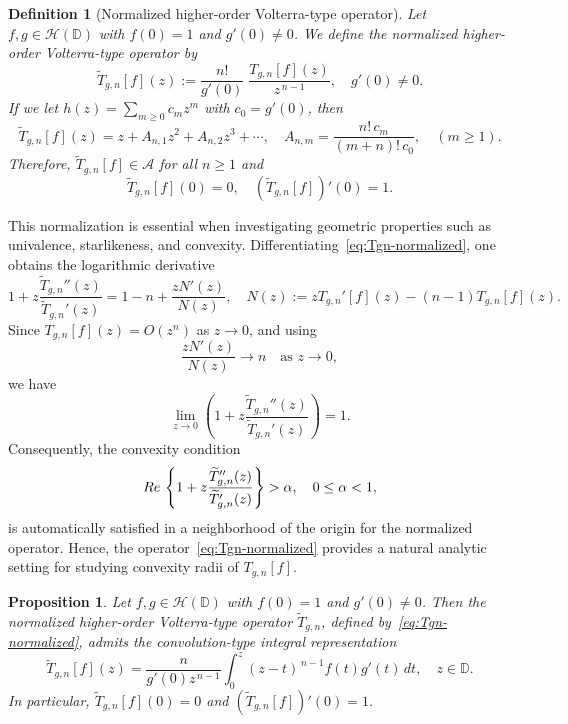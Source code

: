 \documentclass[12pt,a4paper]{amsart}
\numberwithin{equation}{section}
\newtheorem{definition}{Definition}[section]
\newtheorem{proposition}{Proposition}[section]
\theoremstyle{remark}
\begin{document}
\begin{definition}[Normalized higher-order Volterra-type operator]\label{def:normalized-higher}
\rm
Let \(f,g\in\mathcal{H}(\mathbb{D})\) with \(f(0)=1\) and \(g'(0)\neq0\).
We define the normalized higher-order Volterra-type operator by
\begin{equation}\label{eq:Tgn-normalized}
\widetilde T_{g,n}[f](z)
:=\frac{n!}{g'(0)}\;\frac{T_{g,n}[f](z)}{z^{\,n-1}},\quad g'(0)\neq0.
\end{equation}
If we let $h(z)=\sum_{m\ge0}c_m z^m$ with $c_0=g'(0)$, then
\[
\widetilde T_{g,n}[f](z)
= z + A_{n,1} z^2 + A_{n,2} z^3 + \cdots,
\quad
A_{n,m}=\frac{n!\,c_m}{(m+n)!\,c_0},\quad(m\ge1).
\]
Therefore,  \(\widetilde T_{g,n}[f]\in\mathcal{A}\) for all \(n\ge1\) and
\[
\widetilde T_{g,n}[f](0) =0,
\quad 
(\widetilde T_{g,n}[f])'(0)=1.
\]
\end{definition}
This normalization is essential when investigating geometric properties
such as univalence, starlikeness, and convexity.
Differentiating~\eqref{eq:Tgn-normalized}, one obtains the logarithmic derivative
\[
1+z\frac{\widetilde T_{g,n}''(z)}{\widetilde T_{g,n}'(z)}
=1-n+\frac{zN'(z)}{N(z)}, 
\quad 
N(z):=zT_{g,n}'[f](z)-(n-1)T_{g,n}[f](z).
\]
Since \(T_{g,n}[f](z)=O(z^{n})\) as \(z\to0\), and using 
\[
\frac{zN'(z)}{N(z)}\longrightarrow n\quad\text{as }z\to0,
\]
we have
\[
\lim_{z\to0}\left(1+z\frac{\widetilde T_{g,n}''(z)}{\widetilde T_{g,n}'(z)}\right)
=1.
\]
Consequently, the convexity condition
\[
{\rm Re}\,\left\{1+z\frac{\widetilde T_{g,n}''(z)}{\widetilde T_{g,n}'(z)}\right\}>\alpha,
\quad 0\le\alpha<1,
\]
is automatically satisfied in a neighborhood of the origin for the normalized operator.
Hence, the operator~\eqref{eq:Tgn-normalized} provides a natural analytic setting
for studying convexity radii of \(T_{g,n}[f]\).



\begin{proposition}\label{prop:normalized-convolution}
Let \(f,g\in\mathcal{H}(\mathbb{D})\) with \(f(0)=1\) and \(g'(0)\neq0\).
Then the normalized higher-order Volterra-type operator \(\widetilde{T}_{g,n}\),
defined by~\eqref{eq:Tgn-normalized}, admits the convolution-type integral representation
\begin{equation}\label{eq:normalized-convolution}
\widetilde{T}_{g,n}[f](z)
=\frac{n}{g'(0) z^{\,n-1}}
\int_{0}^{z}(z-t)^{\,n-1}f(t)g'(t)\,dt,
\quad z\in\mathbb{D}.
\end{equation}
In particular, \(\widetilde{T}_{g,n}[f](0) =0\) and \((\widetilde{T}_{g,n}[f])'(0)=1.\)
\end{proposition}
\end{document}
